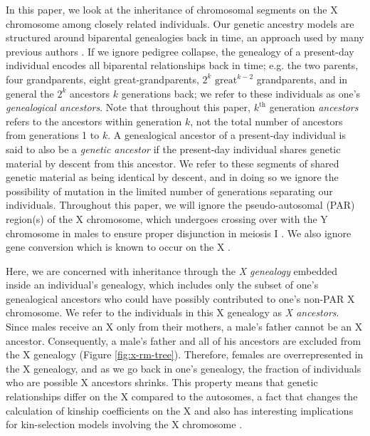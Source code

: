 \documentclass[9pt,twocolumn,twoside]{gsajnl}
\begin{document}
In this paper, we look at the inheritance of chromosomal segments on the X
chromosome among closely related individuals. Our genetic ancestry models are
structured around biparental genealogies back in time, an approach used by many
previous authors \citep[e.g.,][]{Donnelly:1983fi,
chang1999recent,Barton:2011iq,Rohde:2004kl}. If we ignore pedigree collapse,
the genealogy of a present-day individual encodes all biparental relationships
back in time; e.g. the two parents, four grandparents, eight
great-grandparents, $2^k$ $\text{great}^{k-2}$ grandparents, and in general the
$2^k$ ancestors $k$ generations back; we refer to these individuals as one's
\emph{genealogical ancestors}. Note that throughout this paper, $k^\text{th}$
generation \emph{ancestors} refers to the ancestors within generation $k$, not
the total number of ancestors from generations 1 to $k$. A genealogical
ancestor of a present-day individual is said to also be a \emph{genetic
ancestor} if the present-day individual shares genetic material by descent from
this ancestor.  We refer to these segments of shared genetic material as being
identical by descent, and in doing so we ignore the possibility of mutation in
the limited number of generations separating our individuals. Throughout this
paper, we will ignore the pseudo-autosomal (PAR) region(s) of the X chromosome,
which undergoes crossing over with the Y chromosome in males
\citep{koller1934genetical} to ensure proper disjunction in meiosis I
\citep{hassold1991xy}. We also ignore gene conversion which is known to occur
on the X \citep{Rosser:2009df}. 

Here, we are concerned with inheritance through the \emph{X genealogy} embedded
inside an individual's genealogy, which includes only the subset of one's
genealogical ancestors who could have possibly contributed to one's non-PAR X
chromosome. We refer to the individuals in this X genealogy as \emph{X
ancestors}. Since males receive an X only from their mothers, a male's father
cannot be an X ancestor. Consequently, a male's father and all of his ancestors
are excluded from the X genealogy (Figure \ref{fig:x-rm-tree}). Therefore,
females are overrepresented in the X genealogy, and as we go back in one's
genealogy, the fraction of individuals who are possible X ancestors shrinks.
This property means that genetic relationships differ on the X compared to the
autosomes, a fact that changes the calculation of kinship coefficients on the X
\citep{pinto2012general,pinto2011x} and also has interesting implications for
kin-selection models involving the X chromosome
\citep{Fox:2009kh,rice2008sexually}.
\end{document}
